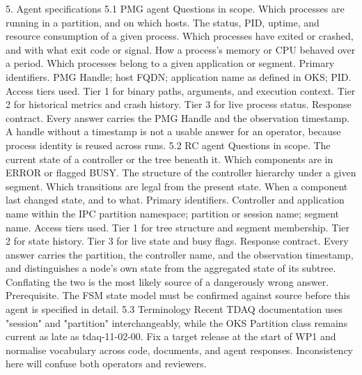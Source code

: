 5. Agent specifications
5.1 PMG agent
Questions in scope. Which processes are running in a partition, and on which hosts. The status, PID, uptime, and resource consumption of a given process. Which processes have exited or crashed, and with what exit code or signal. How a process's memory or CPU behaved over a period. Which processes belong to a given application or segment.
Primary identifiers. PMG Handle; host FQDN; application name as defined in OKS; PID.
Access tiers used. Tier 1 for binary paths, arguments, and execution context. Tier 2 for historical metrics and crash history. Tier 3 for live process status.
Response contract. Every answer carries the PMG Handle and the observation timestamp. A handle without a timestamp is not a usable answer for an operator, because process identity is reused across runs.
5.2 RC agent
Questions in scope. The current state of a controller or the tree beneath it. Which components are in ERROR or flagged BUSY. The structure of the controller hierarchy under a given segment. Which transitions are legal from the present state. When a component last changed state, and to what.
Primary identifiers. Controller and application name within the IPC partition namespace; partition or session name; segment name.
Access tiers used. Tier 1 for tree structure and segment membership. Tier 2 for state history. Tier 3 for live state and busy flags.
Response contract. Every answer carries the partition, the controller name, and the observation timestamp, and distinguishes a node's own state from the aggregated state of its subtree. Conflating the two is the most likely source of a dangerously wrong answer.
Prerequisite. The FSM state model must be confirmed against source before this agent is specified in detail.
5.3 Terminology
Recent TDAQ documentation uses "session" and "partition" interchangeably, while the OKS Partition class remains current as late as tdaq-11-02-00. Fix a target release at the start of WP1 and normalise vocabulary across code, documents, and agent responses. Inconsistency here will confuse both operators and reviewers.

